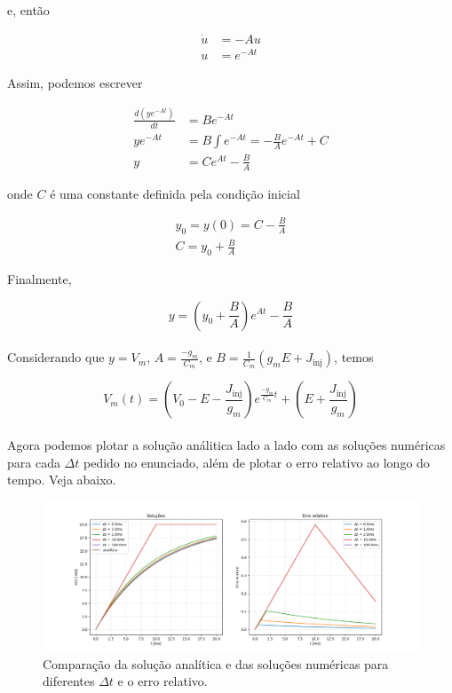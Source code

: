 \documentclass[portuguese,12pt,a4paper]{article}
\begin{document}
	e, então
	
	\begin{align*}
		\dot{u} &= -Au \\
		u &= e^{-At}
	\end{align*}
	
	Assim, podemos escrever
	
	\begin{align*}
		\frac{d(ye^{-At})}{dt} &= Be^{-At}\\ 
		ye^{-At} &= B\int e^{-At} = -\frac{B}{A}e^{-At} + C \\
		y &= Ce^{At} - \frac{B}{A}				
	\end{align*}
	
	onde $C$ é uma constante definida pela condição inicial
	
	\begin{align*}
		y_0 = y(0) = C - \frac{B}{A}\\
		C = y_0 + \frac{B}{A}
	\end{align*}
	
	Finalmente,
	
	$$ y = \left(y_0 + \frac{B}{A}\right)e^{At} - \frac{B}{A}$$\\

	Considerando que $y = V_m$, $A = \frac{-g_m}{C_m}$, e $B = \frac{1}{C_m}(g_mE + J_{\text{inj}})$, temos
	
	$$V_m(t) = \left(V_0 - E - \frac{J_{\text{inj}}}{g_m}\right)e^{\frac{-g_m}{C_m}t} + \left(E + \frac{J_{\text{inj}}}{g_m}\right)$$
	\\
	
	Agora podemos plotar a solução análitica lado a lado com as soluções numéricas para cada $\Delta t$ pedido no enunciado, além de plotar o erro relativo ao longo do tempo. Veja abaixo.
	
	
	\begin{figure}[H]
		\centering
		\hspace*{-3.5cm}
		\includegraphics[width=20cm]{../ex_5.png}
		\caption{Comparação da solução analítica e das soluções numéricas para diferentes $\Delta t$ e o erro relativo.}
	\end{figure}
	
\end{document}

